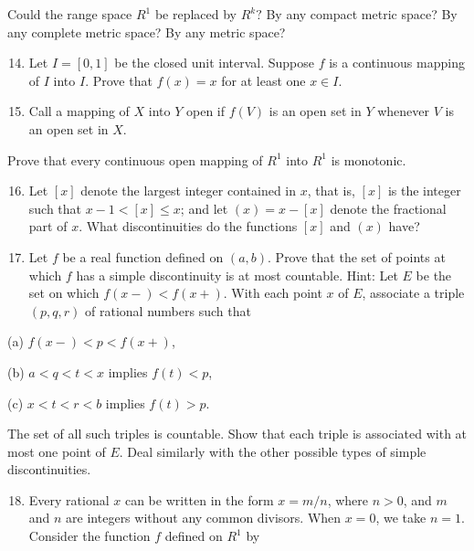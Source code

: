 \documentclass[10pt]{article}
\begin{document}
Could the range space $R^{1}$ be replaced by $R^{k} ?$ By any compact metric space? By any complete metric space? By any metric space?

\begin{enumerate}
  \setcounter{enumi}{13}
  \item Let $I=[0,1]$ be the closed unit interval. Suppose $f$ is a continuous mapping of $I$ into $I$. Prove that $f(x)=x$ for at least one $x \in I$.

  \item Call a mapping of $X$ into $Y$ open if $f(V)$ is an open set in $Y$ whenever $V$ is an open set in $X$.

\end{enumerate}

Prove that every continuous open mapping of $R^{1}$ into $R^{1}$ is monotonic.

\begin{enumerate}
  \setcounter{enumi}{15}
  \item Let $[x]$ denote the largest integer contained in $x$, that is, $[x]$ is the integer such that $x-1<[x] \leq x$; and let $(x)=x-[x]$ denote the fractional part of $x$. What discontinuities do the functions $[x]$ and $(x)$ have?

  \item Let $f$ be a real function defined on $(a, b)$. Prove that the set of points at which $f$ has a simple discontinuity is at most countable. Hint: Let $E$ be the set on which $f(x-)<f(x+)$. With each point $x$ of $E$, associate a triple $(p, q, r)$ of rational numbers such that

\end{enumerate}

(a) $f(x-)<p<f(x+)$,

(b) $a<q<t<x$ implies $f(t)<p$,

(c) $x<t<r<b$ implies $f(t)>p$.

The set of all such triples is countable. Show that each triple is associated with at most one point of $E$. Deal similarly with the other possible types of simple discontinuities.

\begin{enumerate}
  \setcounter{enumi}{17}
  \item Every rational $x$ can be written in the form $x=m / n$, where $n>0$, and $m$ and $n$ are integers without any common divisors. When $x=0$, we take $n=1$. Consider the function $f$ defined on $R^{1}$ by
\end{enumerate}
\end{document}
